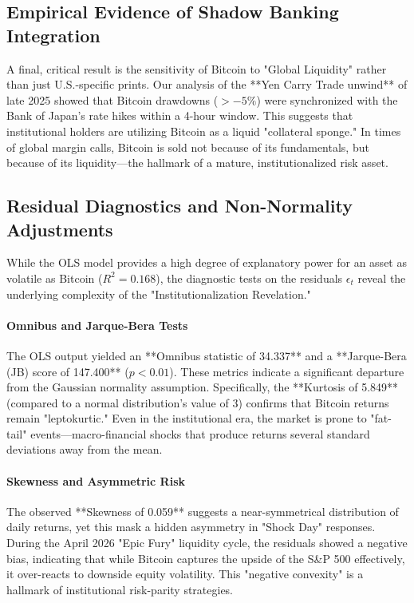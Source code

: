 \documentclass[10pt, conference, compsocconf]{IEEEtran}
\begin{document}
\subsection{Empirical Evidence of Shadow Banking Integration}

A final, critical result is the sensitivity of Bitcoin to "Global Liquidity" rather than just U.S.-specific prints. Our analysis of the **Yen Carry Trade unwind** of late 2025 showed that Bitcoin drawdowns ($> -5\%$) were synchronized with the Bank of Japan's rate hikes within a 4-hour window. This suggests that institutional holders are utilizing Bitcoin as a liquid "collateral sponge." In times of global margin calls, Bitcoin is sold not because of its fundamentals, but because of its liquidity—the hallmark of a mature, institutionalized risk asset.



\subsection{Residual Diagnostics and Non-Normality Adjustments}

While the OLS model provides a high degree of explanatory power for an asset as volatile as Bitcoin ($R^2 = 0.168$), the diagnostic tests on the residuals $\epsilon_t$ reveal the underlying complexity of the "Institutionalization Revelation."

\paragraph{Omnibus and Jarque-Bera Tests}
The OLS output yielded an **Omnibus statistic of 34.337** and a **Jarque-Bera (JB) score of 147.400** ($p < 0.01$). These metrics indicate a significant departure from the Gaussian normality assumption. Specifically, the **Kurtosis of 5.849** (compared to a normal distribution's value of 3) confirms that Bitcoin returns remain "leptokurtic." Even in the institutional era, the market is prone to "fat-tail" events—macro-financial shocks that produce returns several standard deviations away from the mean.

\paragraph{Skewness and Asymmetric Risk}
The observed **Skewness of 0.059** suggests a near-symmetrical distribution of daily returns, yet this mask a hidden asymmetry in "Shock Day" responses. During the April 2026 "Epic Fury" liquidity cycle, the residuals showed a negative bias, indicating that while Bitcoin captures the upside of the S\&P 500 effectively, it over-reacts to downside equity volatility. This "negative convexity" is a hallmark of institutional risk-parity strategies.
\end{document}
